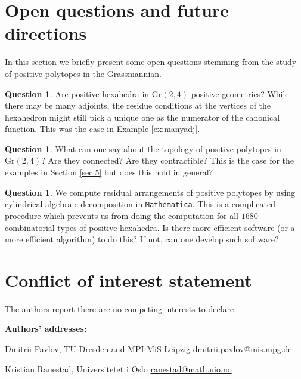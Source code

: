 \documentclass[12pt]{extarticle}
\theoremstyle{definition}
\newtheorem{question}[theorem]{Question}
\begin{document}
\section{Open questions and future directions} \label{sec:6}
In this section we briefly present some open questions stemming from the study of positive polytopes in the Grassmannian. 

\begin{question}
    Are positive hexahedra in $\mathrm{Gr}(2,4)$ positive geometries? While there may be many adjoints, the residue conditions at the vertices of the hexahedron might still pick a unique one as the numerator of the canonical function. This was the case in Example \ref{ex:manyadj}.
\end{question}

\begin{question}
    What can one say about the topology of positive polytopes in $\mathrm{Gr}(2,4)$? Are they connected? Are they contractible? This is the case for the examples in Section \ref{sec:5} but does this hold in general? 
\end{question}

\begin{question}
    We compute residual arrangements of positive polytopes by using cylindrical algebraic decomposition in \texttt{Mathematica}. This is a complicated procedure which prevents us from doing the computation for all $1680$ combinatorial types of positive hexahedra. Is there more efficient software (or a more efficient algorithm) to do this? If not, can one develop such software? 
\end{question}

\section*{Conflict of interest statement}
The authors report there are no competing interests to declare.




\bigskip
\bigskip

\noindent
\footnotesize
{\bf Authors' addresses:}

\smallskip


\noindent Dmitrii Pavlov,
TU Dresden and MPI MiS Leipzig
\hfill \url{dmitrii.pavlov@mis.mpg.de}

\noindent Kristian Ranestad,
Universitetet i Oslo
\hfill \url{ranestad@math.uio.no}
\end{document}
